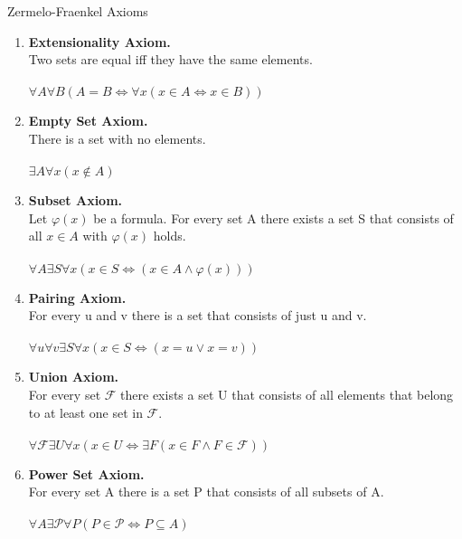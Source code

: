 \begin{definition}{Zermelo-Fraenkel Axioms}{}
   \begin{enumerate}
        \item \textbf{Extensionality Axiom.}\\
        Two sets are equal iff they have the same elements.\\
        \\
        $\forall A \forall B (A=B \iff \forall x (x \in A \iff x \in B))$ \\
        \item \textbf{Empty Set Axiom.} \\
        There is a set with no elements.\\
        \\
        $\exists A \forall x (x \notin A)$\\
        \item \textbf{Subset Axiom.} \\
        Let $\varphi(x)$ be a formula. For every set A there exists a set S that consists of all $x \in A$ with $\varphi(x)$ holds.\\
        \\
        $\forall A \exists S \forall x (x \in S \iff (x \in A \wedge \varphi(x))) $\\
        \item \textbf{Pairing Axiom.}\\
        For every u and v there is a set that consists of just u and v.\\
        \\
        $\forall u \forall v \exists S \forall x (x \in S \iff (x = u \vee x = v)) $\\
        
        \item \textbf{Union Axiom.}\\
        For every set $\mathcal{F}$ there exists a set U that consists of all elements that belong to at least one set in $\mathcal{F}$.\\
        \\
        $\forall \mathcal{F} \exists U \forall x (x \in U \iff \exists F (x \in F \wedge F \in \mathcal{F}))$\\
        \item \textbf{Power Set Axiom.}\\
        For every set A there is a set P that consists of all subsets of A.\\
        \\
        $\forall A \exists \mathcal{P} \forall P (P \in \mathcal{P} \iff P \subseteq A)$
   \end{enumerate} 
\end{definition}

